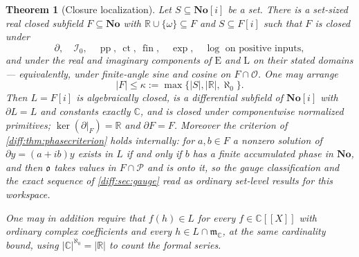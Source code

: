 \documentclass[11pt,letterpaper]{article}
\numberwithin{equation}{section}
\newtheorem{theorem}{Theorem}[section]
\theoremstyle{definition}
\theoremstyle{remark}
\newcommand{\No}{\mathbf{No}}
\newcommand{\SC}{\mathbf{No}[i]}
\newcommand{\R}{\mathbb R}
\newcommand{\C}{\mathbb C}
\newcommand{\der}{\partial}
\newcommand{\Ofin}{\mathcal O}
\newcommand{\mm}{\mathfrak m}
\newcommand{\Pcl}{\mathcal P}
\newcommand{\Izero}{\mathcal I_{0}}
\newcommand{\Obs}{\mathfrak o}
\newcommand{\pp}{\operatorname{pp}}
\newcommand{\ct}{\operatorname{ct}}
\newcommand{\fin}{\operatorname{fin}}
\newcommand{\Emm}{\mathrm{E}}
\newcommand{\Lmm}{\mathrm{L}}
\newcommand{\Ker}{\operatorname{ker}}
\newcommand{\abs}[1]{\lvert#1\rvert}
\begin{document}
\begin{theorem}[Closure localization]
\label{diff:thm:localize}
Let $S\subseteq\SC$ be a set. There is a set-sized \emph{real closed} subfield
$F\subseteq\No$ with $\R\cup\{\omega\}\subseteq F$ and $S\subseteq F[i]$ such
that $F$ is closed under
\[
 \der,\quad \Izero,\quad \pp,\ \ct,\ \fin,\quad \exp,\quad
 \log\text{ on positive inputs},
\]
and under the real and imaginary components of $\Emm$ and $\Lmm$ on their
stated domains --- equivalently, under finite-angle sine and cosine on
$F\cap\Ofin$. One may arrange
\[
 \abs F\leq\kappa:=\max\{\abs S,\abs\R,\aleph_{0}\}.
\]
Then $L=F[i]$ is algebraically closed, is a differential subfield of $\SC$
with $\der L=L$ and constants exactly $\C$, and is closed under componentwise
normalized primitives; $\Ker(\der|_{F})=\R$ and $\der F=F$. Moreover the
criterion of \cref{diff:thm:phasecriterion} holds \emph{internally}: for
$a,b\in F$ a nonzero solution of $\der y=(a+ib)y$ exists in $L$ if and only if
$b$ has a finite accumulated phase in $\No$, and then $\Obs$ takes values in
$F\cap\Pcl$ and is onto it, so the gauge classification and the exact sequence
of \cref{diff:sec:gauge} read as ordinary set-level results for this
workspace.

One may in addition require that $f(h)\in L$ for every $f\in\C[[X]]$ with
ordinary complex coefficients and every $h\in L\cap\mm_{\C}$, at the same
cardinality bound, using $\abs\C^{\aleph_{0}}=\abs\R$ to count the formal
series.
\end{theorem}
\end{document}
